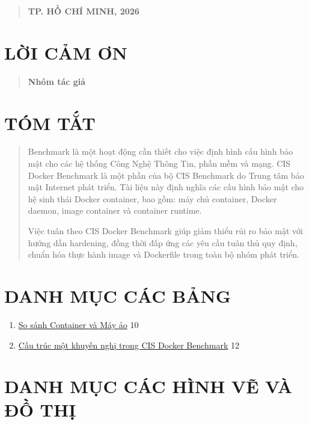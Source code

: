 \begin{quote}
\textbf{TP. HỒ CHÍ MINH, 2026}
\end{quote}

\section{LỜI CẢM ƠN}\label{lux1eddi-cux1ea3m-ux1a1n}

\begin{quote}
\textbf{Nhóm tác giả}
\end{quote}

\section{TÓM TẮT}\label{tuxf3m-tux1eaft}

\begin{quote}
Benchmark là một hoạt động cần thiết cho việc định hình cấu hình bảo mật cho các hệ thống Công Nghệ Thông Tin, phần mềm và mạng. CIS Docker Benchmark là một phần của bộ CIS Benchmark do Trung tâm bảo mật Internet phát triển. Tài liệu này định nghĩa các cấu hình bảo mật cho hệ sinh thái Docker container, bao gồm: máy chủ container, Docker daemon, image container và container runtime.

Việc tuân theo CIS Docker Benchmark giúp giảm thiểu rủi ro bảo mật với hướng dẫn hardening, đồng thời đấp ứng các yêu cầu tuân thủ quy định, chuẩn hóa thực hành image và Dockerfile trong toàn bộ nhóm phát triển.
\end{quote}

\section{DANH MỤC CÁC BẢNG}\label{danh-mux1ee5c-cuxe1c-bux1ea3ng}

\begin{enumerate}
\def\labelenumi{\arabic{enumi}.}
\item
  \hyperref[_bookmark14]{So sánh Container và Máy ảo} 10
\item
  \hyperref[_bookmark18]{Cấu trúc một khuyến nghị trong CIS Docker Benchmark} 12
\end{enumerate}

\section{DANH MỤC CÁC HÌNH VẼ VÀ ĐỒ THỊ}\label{danh-mux1ee5c-cuxe1c-huxecnh-vux1ebd-vuxe0-ux111ux1ed3-thux1ecb}

